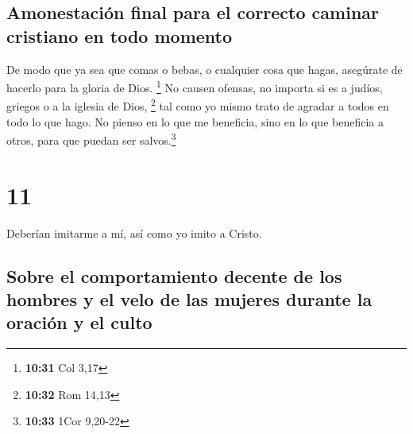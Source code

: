 \hypertarget{amonestaciuxf3n-final-para-el-correcto-caminar-cristiano-en-todo-momento}{%
\subsection{Amonestación final para el correcto caminar cristiano en
todo
momento}\label{amonestaciuxf3n-final-para-el-correcto-caminar-cristiano-en-todo-momento}}

 De modo que ya sea que comas o bebas, o cualquier cosa
que hagas, asegúrate de hacerlo para la gloria de Dios. \footnote{\textbf{10:31}
  Col 3,17}  No causen ofensas, no importa si es a
judíos, griegos o a la iglesia de Dios, \footnote{\textbf{10:32} Rom
  14,13}  tal como yo mismo trato de agradar a todos en
todo lo que hago. No pienso en lo que me beneficia, sino en lo que
beneficia a otros, para que puedan ser salvos.\footnote{\textbf{10:33}
  1Cor 9,20-22}

\hypertarget{section-10}{%
\section{11}\label{section-10}}

 Deberían imitarme a mí, así como yo imito a Cristo.

\hypertarget{sobre-el-comportamiento-decente-de-los-hombres-y-el-velo-de-las-mujeres-durante-la-oraciuxf3n-y-el-culto}{%
\subsection{Sobre el comportamiento decente de los hombres y el velo de
las mujeres durante la oración y el
culto}\label{sobre-el-comportamiento-decente-de-los-hombres-y-el-velo-de-las-mujeres-durante-la-oraciuxf3n-y-el-culto}}

